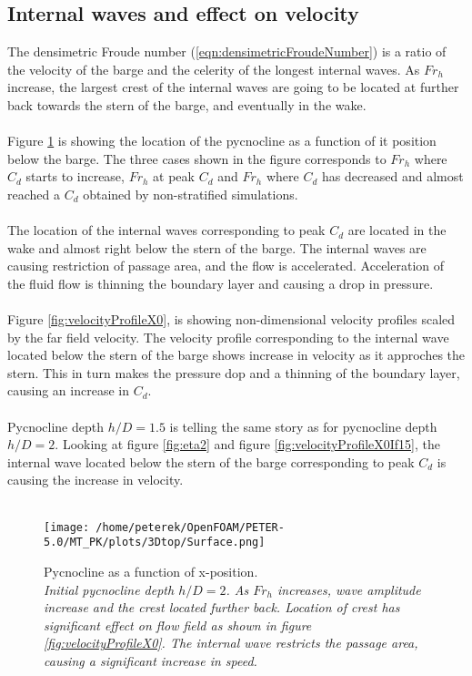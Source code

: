 \documentclass[a4paper, 12pt]{report}
\begin{document}
\subsection{Internal waves and effect on velocity}
The densimetric Froude number (\ref{eqn:densimetricFroudeNumber}) is a ratio of the velocity of the barge and the celerity of the longest internal waves. As $Fr_h$ increase, the largest crest of the internal waves are going to be located at further back towards the stern of the barge, and eventually in the wake.\\
\\
Figure \ref{fig:eta1} is showing the location of the pycnocline as a function of it position below the barge. The three cases shown in the figure corresponds to $Fr_h$ where $C_d$ starts to increase, $Fr_h$ at peak $C_d$ and $Fr_h$ where $C_d$ has decreased and almost reached a $C_d$ obtained by non-stratified simulations.\\
\\
The location of the internal waves corresponding to peak $C_d$ are located in the wake and almost right below the stern of the barge. The internal waves are causing restriction of passage area, and the flow is accelerated. Acceleration of the fluid flow is thinning the boundary layer and causing a drop in pressure.\\
\\
Figure \ref{fig:velocityProfileX0}, is showing non-dimensional velocity profiles scaled by the far field velocity. The velocity profile corresponding to the internal wave located below the stern of the barge shows increase in velocity as it approches the stern. This in turn makes the pressure dop and a thinning of the boundary layer, causing an increase in $C_d$.\\
\\Pycnocline depth $h/D=1.5$ is telling the same story as for pycnocline depth $h/D=2$. Looking at figure \ref{fig:eta2} and figure \ref{fig:velocityProfileX0If15}, the internal wave located below the stern of the barge corresponding to peak $C_d$ is causing the increase in velocity.\\
\\
\begin{minipage}[t]{.45\textwidth} 
	\begin{figure}[H]
		\centering
		\texttt{[image: /home/peterek/OpenFOAM/PETER-5.0/MT\_PK/plots/3Dtop/Surface.png]}
		\caption{Pycnocline as a function of x-position. \\ \textit{Initial pycnocline depth $h/D=2$. As $Fr_h$ increases, wave amplitude increase and the crest located further back. Location of crest has significant effect on flow field as shown in figure \ref{fig:velocityProfileX0}. The internal wave restricts the passage area, causing a significant increase in speed.}}
		\label{fig:eta1}
	\end{figure}
\end{minipage}\hfill
\end{document}
